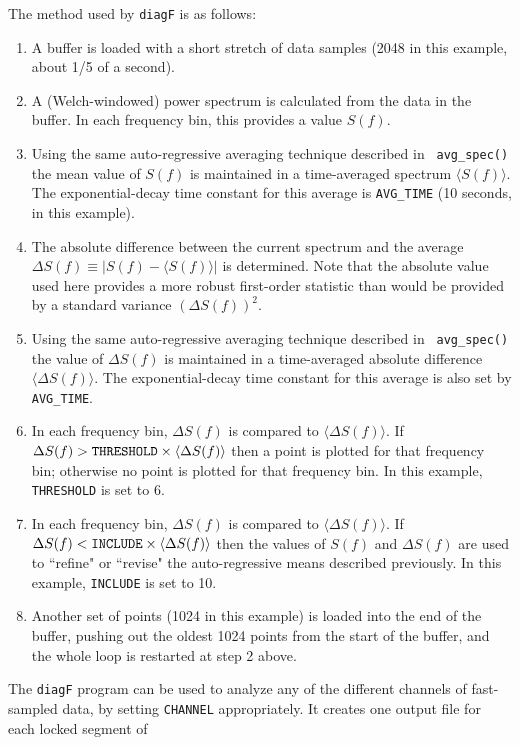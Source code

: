The method used by {\tt diagF} is as follows:
\begin{enumerate}
\item
A buffer is loaded with a short stretch of data samples (2048 in this
example, about 1/5 of a second).
\item
A (Welch-windowed) power spectrum is calculated from the data in 
the buffer.  In each frequency bin,
 this provides a value $S(f)$.
\item
Using the same auto-regressive averaging technique described in {\tt
avg\_spec()} the mean value of $S(f)$ is maintained in a time-averaged
spectrum $\langle S(f) \rangle$.  The exponential-decay time constant
for this average is {\tt AVG\_TIME} (10 seconds, in this example).
\item
The absolute difference between the current spectrum and the average
$\Delta S(f) \equiv |S(f) - \langle S(f) \rangle |$ is determined. Note
that the absolute value used here provides a more robust first-order
statistic than would be provided by a standard variance $(\Delta
S(f))^2$.
\item
Using the same auto-regressive averaging technique described in {\tt
avg\_spec()} the value of $\Delta S(f)$ is maintained in a
time-averaged absolute difference $\langle \Delta S(f) \rangle$.  The
exponential-decay time constant for this average is also set by {\tt
AVG\_TIME}.
\item
In each frequency bin, $\Delta S(f)$ is compared to $\langle \Delta
S(f) \rangle$.  If $\Delta S(f) > {\tt THRESHOLD} \times \langle \Delta
S(f) \rangle$ then a point is plotted for that frequency bin; otherwise
no point is plotted for that frequency bin.  In this example, {\tt
THRESHOLD} is set to 6.
\item
In each frequency bin, $\Delta S(f)$ is compared to $\langle \Delta
S(f) \rangle$.  If $\Delta S(f) < {\tt INCLUDE} \times \langle \Delta
S(f) \rangle$ then the values of $S(f)$ and $\Delta S(f)$ are used to
``refine" or ``revise" the auto-regressive means described previously.
In this example, {\tt INCLUDE} is set to 10.
\item
Another set of points (1024 in this example) is loaded into the
end of the buffer, pushing out the oldest 1024 points from the start
of the buffer, and the whole loop is restarted at step 2 above.
\end{enumerate}
The {\tt diagF} program can be used to analyze any of the different
channels of fast-sampled data, by setting {\tt CHANNEL}
appropriately.  It creates one output file for each locked segment of
